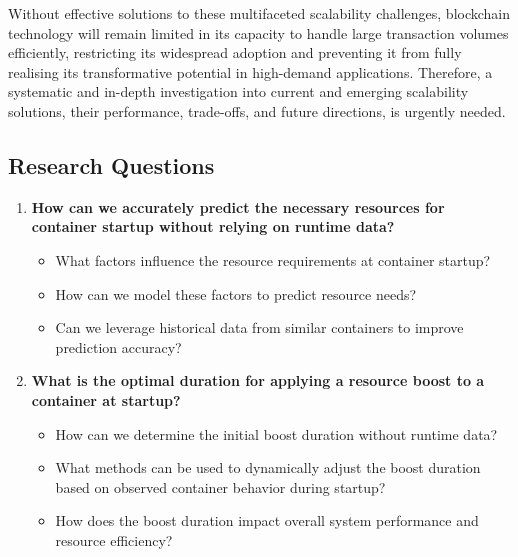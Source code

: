 Without effective solutions to these multifaceted scalability challenges, blockchain technology will remain limited in its capacity to handle large transaction volumes efficiently, restricting its widespread adoption and preventing it from fully realising its transformative potential in high-demand applications. Therefore, a systematic and in-depth investigation into current and emerging scalability solutions, their performance, trade-offs, and future directions, is urgently needed.

\subsection{Research Questions}
\vspace{12pt}
\begin{enumerate}
    \item \textbf{How can we accurately predict the necessary resources for container startup without relying on runtime data?}
    
    \begin{itemize}
        \item What factors influence the resource requirements at container startup?
        \item How can we model these factors to predict resource needs?
        \item Can we leverage historical data from similar containers to improve prediction accuracy?
    \end{itemize}
    
    \item \textbf{What is the optimal duration for applying a resource boost to a container at startup?}
    
    \begin{itemize}
        \item How can we determine the initial boost duration without runtime data?
        \item What methods can be used to dynamically adjust the boost duration based on observed container behavior during startup?
        \item How does the boost duration impact overall system performance and resource efficiency?
    \end{itemize}
    
\end{enumerate}

